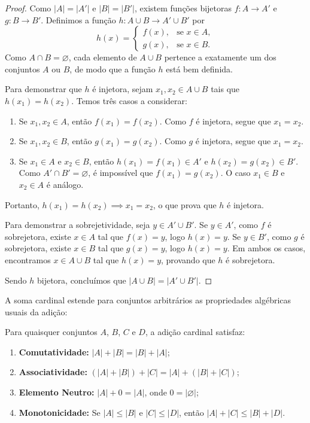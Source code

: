 \begin{proof}
    Como \(|A| = |A'|\) e \(|B| = |B'|\), existem funções bijetoras \(f: A \to A'\) e \(g: B \to B'\). Definimos a função \(h: A \cup B \to A' \cup B'\) por
    \[
        h(x) =
        \begin{cases}
            f(x), & \text{se } x \in A, \\
            g(x), & \text{se } x \in B.
        \end{cases}
    \]
    Como \(A \cap B = \varnothing\), cada elemento de \(A \cup B\) pertence a exatamente um dos conjuntos \(A\) ou \(B\), de modo que a função \(h\) está bem definida.

    Para demonstrar que \(h\) é injetora, sejam \(x_1, x_2 \in A \cup B\) tais que \(h(x_1) = h(x_2)\). Temos três casos a considerar:
    \begin{enumerate}
        \item Se \(x_1, x_2 \in A\), então \(f(x_1) = f(x_2)\). Como \(f\) é injetora, segue que \(x_1 = x_2\).
        \item Se \(x_1, x_2 \in B\), então \(g(x_1) = g(x_2)\). Como \(g\) é injetora, segue que \(x_1 = x_2\).
        \item Se \(x_1 \in A\) e \(x_2 \in B\), então \(h(x_1) = f(x_1) \in A'\) e \(h(x_2) = g(x_2) \in B'\). Como \(A' \cap B' = \varnothing\), é impossível que \(f(x_1) = g(x_2)\). O caso \(x_1 \in B\) e \(x_2 \in A\) é análogo.
    \end{enumerate}
    Portanto, \(h(x_1) = h(x_2) \implies x_1 = x_2\), o que prova que \(h\) é injetora.

    Para demonstrar a sobrejetividade, seja \(y \in A' \cup B'\). Se \(y \in A'\), como \(f\) é sobrejetora, existe \(x \in A\) tal que \(f(x) = y\), logo \(h(x) = y\). Se \(y \in B'\), como \(g\) é sobrejetora, existe \(x \in B\) tal que \(g(x) = y\), logo \(h(x) = y\). Em ambos os casos, encontramos \(x \in A \cup B\) tal que \(h(x) = y\), provando que \(h\) é sobrejetora.

    Sendo \(h\) bijetora, concluímos que \(|A \cup B| = |A' \cup B'|\).
\end{proof}

A soma cardinal estende para conjuntos arbitrários as propriedades algébricas usuais da adição:

\begin{proposicao}
    \label{prop:propriedades_adicao_cardinal}
    Para quaisquer conjuntos \(A\), \(B\), \(C\) e \(D\), a adição cardinal satisfaz:
    \begin{enumerate}
        \item \textbf{Comutatividade:} \(|A| + |B| = |B| + |A|\);
        \item \textbf{Associatividade:} \((|A| + |B|) + |C| = |A| + (|B| + |C|)\);
        \item \textbf{Elemento Neutro:} \(|A| + 0 = |A|\), onde \(0 = |\varnothing|\);
        \item \textbf{Monotonicidade:} Se \(|A| \leq |B|\) e \(|C| \leq |D|\), então \(|A| + |C| \leq |B| + |D|\).
    \end{enumerate}
\end{proposicao}


